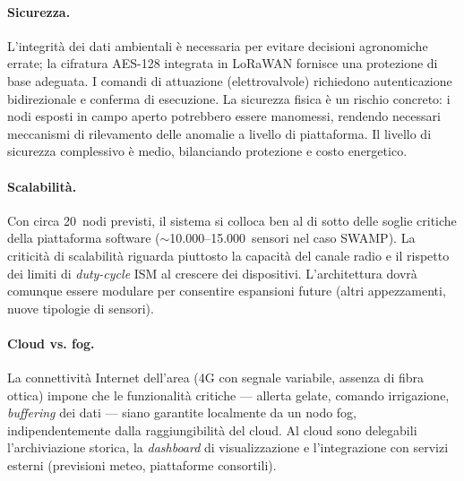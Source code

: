 \paragraph{Sicurezza.} L'integrità dei dati ambientali è necessaria per evitare decisioni agronomiche errate; la cifratura AES-128 integrata in LoRaWAN fornisce una protezione di base adeguata. I comandi di attuazione (elettrovalvole) richiedono autenticazione bidirezionale e conferma di esecuzione. La sicurezza fisica è un rischio concreto: i nodi esposti in campo aperto potrebbero essere manomessi, rendendo necessari meccanismi di rilevamento delle anomalie a livello di piattaforma. Il livello di sicurezza complessivo è medio, bilanciando protezione e costo energetico.

\paragraph{Scalabilità.} Con circa 20~nodi previsti, il sistema si colloca ben al di sotto delle soglie critiche della piattaforma software ($\sim$10.000--15.000~sensori nel caso SWAMP). La criticità di scalabilità riguarda piuttosto la capacità del canale radio e il rispetto dei limiti di \textit{duty-cycle} ISM al crescere dei dispositivi. L'architettura dovrà comunque essere modulare per consentire espansioni future (altri appezzamenti, nuove tipologie di sensori).

\paragraph{Cloud vs. fog.} La connettività Internet dell'area (4G con segnale variabile, assenza di fibra ottica) impone che le funzionalità critiche --- allerta gelate, comando irrigazione, \textit{buffering} dei dati --- siano garantite localmente da un nodo fog, indipendentemente dalla raggiungibilità del cloud. Al cloud sono delegabili l'archiviazione storica, la \textit{dashboard} di visualizzazione e l'integrazione con servizi esterni (previsioni meteo, piattaforme consortili).

